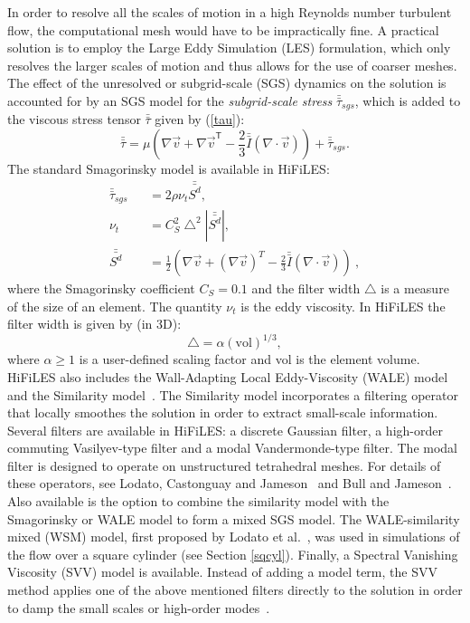 In order to resolve all the scales of motion in a high Reynolds number turbulent flow, the computational mesh would have to be impractically fine.
A practical solution is to employ the Large Eddy Simulation (LES) formulation, which only resolves the larger scales of motion and thus allows for the use of coarser meshes.
The effect of the unresolved or subgrid-scale (SGS) dynamics on the solution is accounted for by an SGS model for the \emph{subgrid-scale stress} $\bar{\bar{\tau}}_{sgs}$, which is added to the viscous stress tensor $\bar{\bar{\tau}}$ given by (\ref{tau}):
%
\begin{equation}\label{tausgs}
\bar{\bar{\tau}} = \mu \left ( \nabla \vec{v} + {\nabla \vec{v}}^\mathsf{T}  - \frac{2}{3} \bar{\bar{I}} (\nabla \cdot \vec{v} ) \right ) + \bar{\bar{\tau}}_{sgs}.
\end{equation}
%
The standard Smagorinsky model\cite{smagorinsky1963} is available in HiFiLES:
%
\begin{eqnarray}\label{smag}
\bar{\bar{\tau}}_{sgs} &&= 2 \rho \nu_t \bar{\bar{S^d}}, \\
\nu_t &&= C_S^2 \bigtriangleup^2 | \bar{\bar{S^d}} |,\\
\bar{\bar{S^d}} &&= \frac 1 2 \left (\nabla \vec v + (\nabla \vec v)^T - \frac 2 3 \bar{\bar{I}} (\nabla \cdot \vec{v} ) \right )\ ,
\end{eqnarray}
%
where the Smagorinsky coefficient $C_S = 0.1$ and the filter width $\bigtriangleup$ is a measure of the size of an element.
The quantity $\nu_t$ is the eddy viscosity.
In HiFiLES the filter width is given by (in 3D):
%
\begin{equation}
\bigtriangleup = \alpha (\text{vol})^{1/3},
\end{equation}
%
where $\alpha \geq 1$ is a user-defined scaling factor and vol is the element volume.
HiFiLES also includes the Wall-Adapting Local Eddy-Viscosity (WALE) model~\cite{nicoud1999} and the Similarity model~\cite{bardina1980}.
The Similarity model incorporates a filtering operator that locally smoothes the solution in order to extract small-scale information.
Several filters are available in HiFiLES: a discrete Gaussian filter\cite{lodato2012b}, a high-order commuting Vasilyev-type filter\cite{vasilyev1998,vasilyev2001} and a modal Vandermonde-type filter\cite{blackburn2003}.
The modal filter is designed to operate on unstructured tetrahedral meshes.
For details of these operators, see Lodato, Castonguay and Jameson~\cite{lodato2012b} and Bull and Jameson~\cite{bull2013a}.
Also available is the option to combine the similarity model with the Smagorinsky or WALE model to form a mixed SGS model.
The WALE-similarity mixed (WSM) model, first proposed by Lodato et al.~\cite{lodato2009}, was used in simulations of the flow over a square cylinder (see Section \ref{sqcyl}).
Finally, a Spectral Vanishing Viscosity (SVV) model is available.
Instead of adding a model term, the SVV method applies one of the above mentioned filters directly to the solution in order to damp the small scales or high-order modes~\cite{karamanos2000}.

